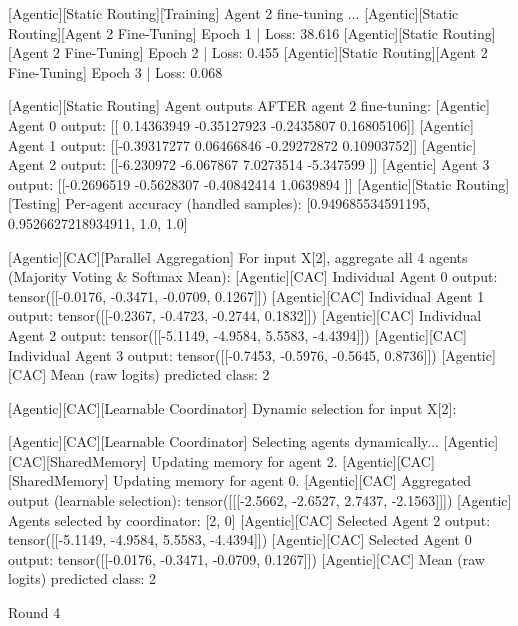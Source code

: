 [Agentic][Static Routing][Training] Agent 2 fine-tuning ...
[Agentic][Static Routing][Agent 2 Fine-Tuning] Epoch 1 | Loss: 38.616
[Agentic][Static Routing][Agent 2 Fine-Tuning] Epoch 2 | Loss: 0.455
[Agentic][Static Routing][Agent 2 Fine-Tuning] Epoch 3 | Loss: 0.068

[Agentic][Static Routing] Agent outputs AFTER agent 2 fine-tuning:
[Agentic] Agent 0 output: [[ 0.14363949 -0.35127923 -0.2435807   0.16805106]]
[Agentic] Agent 1 output: [[-0.39317277  0.06466846 -0.29272872  0.10903752]]
[Agentic] Agent 2 output: [[-6.230972  -6.067867   7.0273514 -5.347599 ]]
[Agentic] Agent 3 output: [[-0.2696519  -0.5628307  -0.40842414  1.0639894 ]]
[Agentic][Static Routing][Testing] Per-agent accuracy (handled samples): [0.949685534591195, 0.9526627218934911, 1.0, 1.0]

[Agentic][CAC][Parallel Aggregation] For input X[2], aggregate all 4 agents (Majority Voting & Softmax Mean):
[Agentic][CAC] Individual Agent 0 output: tensor([[-0.0176, -0.3471, -0.0709,  0.1267]])
[Agentic][CAC] Individual Agent 1 output: tensor([[-0.2367, -0.4723, -0.2744,  0.1832]])
[Agentic][CAC] Individual Agent 2 output: tensor([[-5.1149, -4.9584,  5.5583, -4.4394]])
[Agentic][CAC] Individual Agent 3 output: tensor([[-0.7453, -0.5976, -0.5645,  0.8736]])
[Agentic][CAC] Mean (raw logits) predicted class: 2

[Agentic][CAC][Learnable Coordinator] Dynamic selection for input X[2]:

[Agentic][CAC][Learnable Coordinator] Selecting agents dynamically...
[Agentic][CAC][SharedMemory] Updating memory for agent 2.
[Agentic][CAC][SharedMemory] Updating memory for agent 0.
[Agentic][CAC] Aggregated output (learnable selection): tensor([[[-2.5662, -2.6527,  2.7437, -2.1563]]])
[Agentic] Agents selected by coordinator: [2, 0]
[Agentic][CAC] Selected Agent 2 output: tensor([[-5.1149, -4.9584,  5.5583, -4.4394]])
[Agentic][CAC] Selected Agent 0 output: tensor([[-0.0176, -0.3471, -0.0709,  0.1267]])
[Agentic][CAC] Mean (raw logits) predicted class: 2

Round 4

